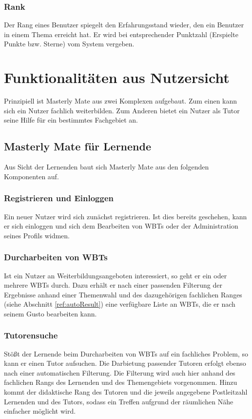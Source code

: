 \subsubsection{Rank}
Der Rang eines Benutzer spiegelt den Erfahrungsstand wieder, den ein Benutzer in
einem Thema erreicht hat. Er wird bei entsprechender Punktzahl (Erspielte Punkte
bzw. Sterne) vom System vergeben.

\section{Funktionalitäten aus Nutzersicht}
Prinzipiell ist Masterly Mate aus zwei Komplexen aufgebaut. Zum einen kann sich
ein Nutzer fachlich weiterbilden. Zum Anderen bietet ein Nutzer als Tutor seine
Hilfe für ein bestimmtes Fachgebiet an.

\subsection{Masterly Mate für Lernende}
Aus Sicht der Lernenden baut sich Masterly Mate aus den folgenden Komponenten
auf.

\subsubsection{Registrieren und Einloggen}
Ein neuer Nutzer wird sich zunächst registrieren. Ist dies bereits geschehen,
kann er sich einloggen und sich dem Bearbeiten von WBTs oder der Administration
seines Profils widmen.

\subsubsection{Durcharbeiten von WBTs}
Ist ein Nutzer an Weiterbildungsangeboten interessiert, so geht er ein oder
mehrere WBTs durch. Dazu erhält er nach einer passenden Filterung der Ergebnisse
anhand einer Themenwahl und des dazugehörigen fachlichen Ranges (siehe Abschnitt
\ref{ref:autoResult}) eine verfügbare Liste an WBTs, die er nach seinem Gusto
bearbeiten kann.

\subsubsection{Tutorensuche}
Stößt der Lernende beim Durcharbeiten von WBTs auf ein fachliches Problem, so
kann er einen Tutor aufsuchen. Die Darbietung passender Tutoren erfolgt ebenso
nach einer automatischen Filterung. Die Filterung wird auch hier anhand des
fachlichen Rangs des Lernenden und des Themengebiets vorgenommen. Hinzu kommt
der didaktische Rang des Tutoren und die jeweils angegebene Postleitzahl
Lernenden und des Tutors, sodass ein Treffen aufgrund der räumlichen Nähe
einfacher möglicht wird.

